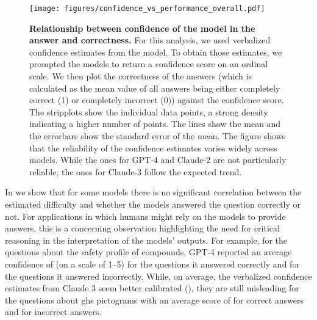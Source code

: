 \documentclass[11pt, oneside]{article}
\begin{document}
\begin{refsection}
\begin{figure}[!h]
    \centering
    \texttt{[image: figures/confidence\_vs\_performance\_overall.pdf]}
    \caption{\textbf{Relationship between confidence of the model in the answer and correctness.} For this analysis, we used verbalized confidence estimates from the model. To obtain those estimates, we prompted the models to return a confidence score on an ordinal scale. We then plot the correctness of the answers (which is calculated as the mean value of all answers being either completely correct (1) or completely incorrect (0)) against the confidence score.
        The stripplots show the individual data points, a strong density indicating a higher number of points. The lines show the mean and the errorbars show the standard error of the mean. The figure shows that the reliability of the confidence estimates varies widely across models. While the ones for GPT-4 and Claude-2 are not particularly reliable, the ones for Claude-3 follow the expected trend.}
    \label{fig:confidence_vs_performance}
\end{figure}

In  we show that for some models there is no significant correlation between the estimated difficulty and whether the models answered the question correctly or not.
For applications in which humans might rely on the models to provide answers, this is a concerning observation highlighting the need for critical reasoning in the interpretation of the models' outputs.\autocite{Li_2023}
For example, for the questions about the safety profile of compounds, GPT-4 reported an average confidence of  (on a scale of 1--5) for the  questions it answered correctly and  for the  questions it answered incorrectly.
While, on average, the verbalized confidence estimates from Claude 3 seem better calibrated (), they are still misleading for the questions about \gls{ghs} pictograms with an average score of  for correct answers and  for incorrect answers.


\end{refsection}
\end{document}

